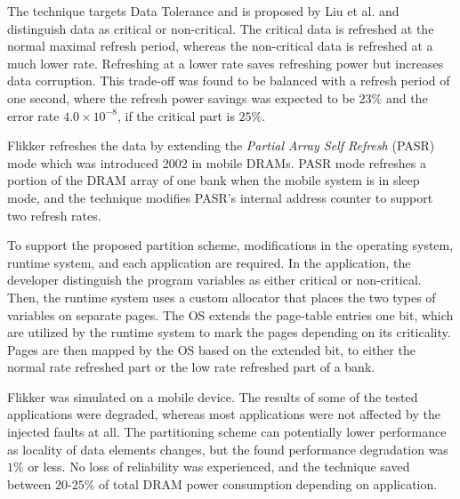 The technique targets Data Tolerance and is proposed by Liu et al. \cite{flikker} and  distinguish data as critical or non-critical. The critical data is refreshed at the normal maximal refresh period, whereas the non-critical data is refreshed at a much lower rate. Refreshing at a lower rate saves refreshing power but increases data corruption. This trade-off was found to be balanced with a refresh period of one second, where the refresh power savings was expected to be $23\%$ and the error rate $4.0 \times 10^{-8}$, if the critical part is $25\%$.

Flikker refreshes the data by extending the \textit{Partial Array Self Refresh} (PASR) mode which was introduced 2002 in mobile DRAMs. PASR mode refreshes a portion of the DRAM array of one bank when the mobile system is in sleep mode, and the technique modifies PASR's internal address counter to support two refresh rates.

To support the proposed partition scheme, modifications in the operating system, runtime system, and each application are required. In the application, the developer distinguish the program variables as either critical or non-critical. Then, the runtime system uses a custom allocator that places the two types of variables on separate pages. The OS extends the page-table entries one bit, which are utilized by the runtime system to mark the pages depending on its criticality. Pages are then mapped by the OS based on the extended bit, to either the normal rate refreshed part or the low rate refreshed part of a bank. %


Flikker was simulated on a mobile device. The results of some of the tested applications were degraded, whereas most applications were not affected by the injected faults at all. The partitioning scheme can potentially lower performance as locality of data elements changes, but the found performance degradation was $1\%$ or less. No loss of reliability was experienced, and the technique saved between $20$-$25\%$ of total DRAM power consumption depending on application.